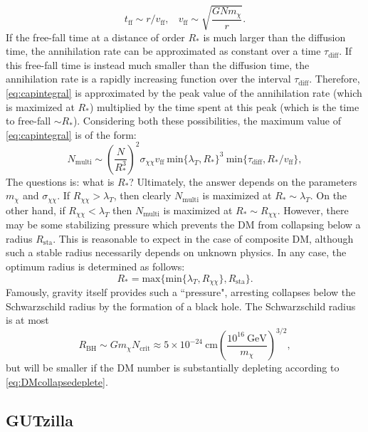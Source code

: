 \documentclass[preprintnumbers,amsmath,amssymb,prd,superscriptaddress]{revtex4}
\newcommand{\GeV}{\text{GeV}}
\newcommand{\cm}{\text{cm}}
\def\r{\right)}
\def\l{\left(}
\begin{document}
\begin{equation}
t_\text{ff} \sim r/v_\text{ff}, ~~~~ v_\text{ff} \sim \sqrt{\frac{G N m_\chi}{r}}. 
\end{equation}
If the free-fall time at a distance of order $R_*$ is much larger than the diffusion time, the annihilation rate can be approximated as constant over a time $\tau_\text{diff}$.
If this free-fall time is instead much smaller than the diffusion time, the annihilation rate is a rapidly increasing function over the interval $\tau_\text{diff}$.
Therefore, \eqref{eq:capintegral} is approximated by the peak value of the annihilation rate (which is maximized at $R_*$) multiplied by the time spent at this peak (which is the time to free-fall $\sim R_*$).
Considering both these possibilities, the maximum value of \eqref{eq:capintegral} is of the form: 
\begin{equation}
N_\text{multi} \sim \l \frac{N}{R_*^3}\r^2  \sigma_{\chi \chi} v_\text{ff} ~\text{min}\{\lambda_T, R_*\}^3 ~\text{min}\{\tau_\text{diff}, R_*/v_\text{ff}\},
\end{equation}
The questions is: what is $R_*$?
Ultimately, the answer depends on the parameters $m_\chi$ and $\sigma_{\chi \chi}$. 
If $R_{\chi \chi} > \lambda_T$, then clearly $N_\text{multi}$ is maximized at $R_* \sim \lambda_T$.
On the other hand, if $R_{\chi \chi} < \lambda_T$ then $N_\text{multi}$ is maximized at $R_* \sim R_{\chi \chi}$.
However, there may be some stabilizing pressure which prevents the DM from collapsing below a radius $R_\text{sta}$.
This is reasonable to expect in the case of composite DM, although such a stable radius necessarily depends on unknown physics. 
In any case, the optimum radius is determined as follows:
\begin{equation}
R_* = \text{max}\{\text{min}\{\lambda_T, R_{\chi \chi}\}, R_\text{sta}\}.
\end{equation}
Famously, gravity itself provides such a ``pressure", arresting collapses below the Schwarzschild radius by the formation of a black hole. 
The Schwarzschild radius is at most
\begin{equation}
R_\text{BH} \sim G m_\chi N_\text{crit} \approx 5 \times 10^{-24} ~\cm \l \frac{10^{16} ~\GeV}{m_\chi} \r^{3/2},
\end{equation}
but will be smaller if the DM number is substantially depleting according to \eqref{eq:DMcollapsedeplete}.

\subsection{GUTzilla}
\end{document}
